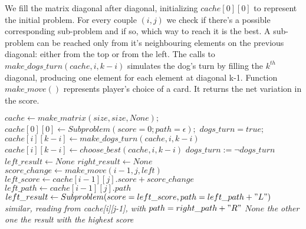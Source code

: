 \documentclass{article}
\begin{document}
We fill the matrix diagonal after diagonal, initializing $cache[0][0]$ to represent the initial problem. For every couple $(i,j)$ we check if there's a possible corresponding sub-problem and if so, which way to reach it is the best. A sub-problem can be reached only from it's neighbouring elements on the previous diagonal: either from the top or from the left. The calls to $ make\_dogs\_turn(cache, i, k-i)$ simulates the dog's turn by filling the $k^{th}$ diagonal, producing one element for each element at diagonal k-1. Function $make\_move()$ represents player's choice of a card. It returns the net variation in the score.
\begin{algorithm}[H]
\begin{algorithmic}
\caption{}
\State $cache \leftarrow make\_matrix(size, size, None);$
\State $cache[0][0] \leftarrow Subproblem(score=0; path=\epsilon);$
\State $dogs\_turn = true;$
            \State $cache[i][k-i] \leftarrow make\_dogs\_turn(cache, i, k-i)$
        \EndFor
    \Else 
            \State $cache[i][k-i] \leftarrow choose\_best(cache, i, k-i)$
        \EndFor
    \EndIf
    \State $dogs\_turn := \neg dogs\_turn$
\EndFor
\EndProcedure
\State \\
\State $left\_result \leftarrow None$
\State $right\_result \leftarrow None$
    \State $score\_change \leftarrow make\_move(i-1, j, left)$
    \State $left\_score \leftarrow cache[i-1][j].score + score\_change$
    \State $left\_path \leftarrow cache[i-1][j].path$
    \State $left\_result \leftarrow Subproblem(score=left\_score, path=left\_path + "L")$
\EndIf
{}
    \State \textit{similar, reading from cache[i][j-1], with}
    \State $path=right\_path + "R"$
\EndIf
    \State \Return $None$
    \State \Return \textit{the other one}
\Else
    \State \Return \textit{the result with the highest score}
\EndIf
\EndProcedure


\end{algorithmic}
\end{algorithm}
\end{document}

